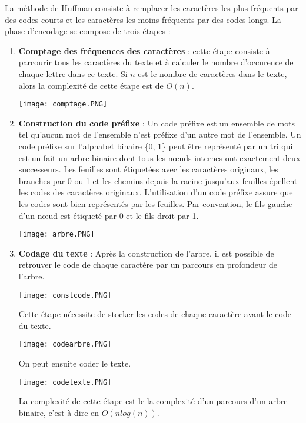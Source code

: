 \documentclass[11pt]{article}
\begin{document}
\begin{enumerate}
La méthode de Huffman consiste à remplacer les caractères les plus fréquents par des codes
courts et les caractères les moins fréquents par des codes longs. La phase d’encodage se compose de trois étapes :
\begin{enumerate}
\item \textbf{Comptage des fréquences des caractères} : cette étape consiste à parcourir tous les caractères du texte et à calculer le nombre d'occurence de chaque lettre dans ce texte. Si $n$ est le nombre de caractères dans le texte, alors la complexité de cette étape est de $O(n)$.
\begin{center}
    \texttt{[image: comptage.PNG]}
\end{center}
\item \textbf{Construction du code préfixe} : Un code préfixe est un ensemble de mots tel qu’aucun mot de
l’ensemble n’est préfixe d’un autre mot de l’ensemble. Un code préfixe sur l’alphabet binaire \{0, 1\} peut être représenté par
un tri qui est un fait un arbre binaire dont tous les nœuds internes ont exactement deux successeurs. Les feuilles sont étiquetées avec les caractères originaux, les branches par 0 ou 1 et les chemins depuis la racine jusqu’aux feuilles épellent les codes des caractères originaux. L’utilisation d’un code préfixe assure que les codes sont bien représentés par les feuilles. Par convention, le fils gauche d’un nœud est étiqueté par 0 et le fils droit
par 1.
\begin{center}
    \texttt{[image: arbre.PNG]}
\end{center}
\item \textbf{Codage du texte} : Après la construction de l’arbre, il est possible de retrouver le code de
chaque caractère par un parcours en profondeur de l’arbre. 
\begin{center}
    \texttt{[image: constcode.PNG]}
\end{center}
Cette étape nécessite de stocker les codes de chaque caractère avant le code du texte.
\begin{center}
    \texttt{[image: codearbre.PNG]}
\end{center}
On peut ensuite coder le texte.
\begin{center}
    \texttt{[image: codetexte.PNG]}
\end{center}
La complexité de cette étape est le la complexité d'un parcours d'un arbre binaire, c'est-à-dire en $O(n log(n))$.\\
\end{enumerate}


\end{enumerate}
\end{document}
